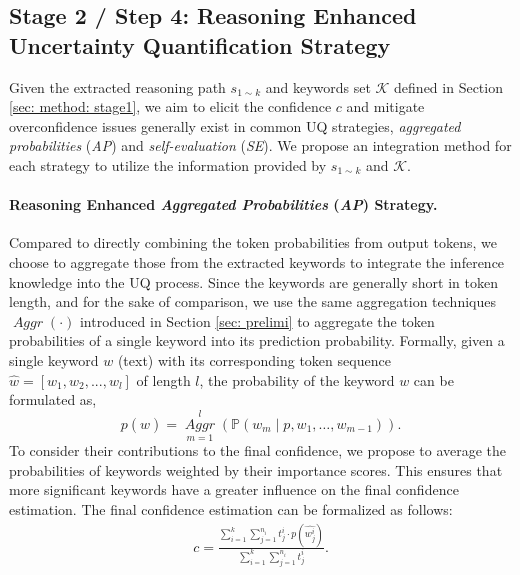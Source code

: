 \documentclass[11pt]{article}
\begin{document}
\subsection{Stage 2 / Step 4: Reasoning Enhanced Uncertainty Quantification Strategy}
\label{sec: method: stage2}
Given the extracted reasoning path $s_{1 \sim k}$ and keywords set $\mathcal{K}$ defined in Section \ref{sec: method: stage1}, we aim to elicit the confidence $c$ and mitigate overconfidence issues generally exist in common UQ strategies, \textit{aggregated probabilities} (\textit{AP}) and \textit{self-evaluation} (\textit{SE}). We propose an integration method for each strategy to utilize the information provided by $s_{1 \sim k}$ and $\mathcal{K}$.

\paragraph{Reasoning Enhanced \textit{Aggregated Probabilities} (\textit{AP}) Strategy.}
Compared to directly combining the token probabilities from output tokens, we choose to aggregate those from the extracted keywords to integrate the inference knowledge into the UQ process. Since the keywords are generally short in token length, and for the sake of comparison, we use the same aggregation techniques $\mathop{\textit{Aggr}}(\cdot)$ introduced in Section \ref{sec: prelimi} to aggregate the token probabilities of a single keyword into its prediction probability. Formally, given a single keyword $w$ (text) with its corresponding token sequence $\hat{w} = [w_1, w_2, ..., w_l]$ of length $l$, the probability of the keyword $w$ can be formulated as,
\begin{equation}
\label{eq:6}
    p(\hat{w}) = \mathop{\textit{Aggr}} \limits_{m=1}^l (\mathbb{P}(w_m \mid p, w_1, \dots, w_{m-1})).
\end{equation}
To consider their contributions to the final confidence, we propose to average the probabilities of keywords weighted by their importance scores. This ensures that more significant keywords have a greater influence on the final confidence estimation. The final confidence estimation can be formalized as follows:
\begin{equation}
\begin{aligned}
\label{eq:5}
    c = \frac{\sum_{i=1}^{k}\sum_{j=1}^{n_i}t_j^i \cdot p(\hat{w_j^i}) }{\sum_{i=1}^{k}\sum_{j=1}^{n_i}t_j^i}.
\end{aligned}
\end{equation}
\end{document}
